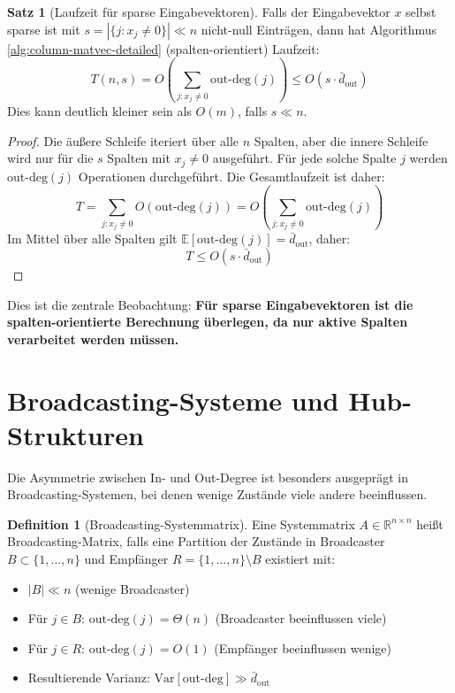﻿\documentclass[a4paper,12pt]{report}
\theoremstyle{definition}
\newtheorem{definition}{Definition}
\newtheorem{satz}{Satz}
\begin{document}
	\begin{satz}[Laufzeit für sparse Eingabevektoren]
		Falls der Eingabevektor $x$ selbst sparse ist mit $s = |\{j : x_j \neq 0\}| \ll n$ nicht-null Einträgen, dann hat Algorithmus \ref{alg:column-matvec-detailed} (spalten-orientiert) Laufzeit:
		\[
		T(n,s) = O\left(\sum_{j: x_j \neq 0} \text{out-deg}(j)\right) \leq O(s \cdot \bar{d}_{\text{out}})
		\]
		Dies kann deutlich kleiner sein als $O(m)$, falls $s \ll n$.
	\end{satz}
	
	\begin{proof}
		Die äußere Schleife iteriert über alle $n$ Spalten, aber die innere Schleife wird nur für die $s$ Spalten mit $x_j \neq 0$ ausgeführt. Für jede solche Spalte $j$ werden $\text{out-deg}(j)$ Operationen durchgeführt. Die Gesamtlaufzeit ist daher:
		\[
		T = \sum_{j: x_j \neq 0} O(\text{out-deg}(j)) = O\left(\sum_{j: x_j \neq 0} \text{out-deg}(j)\right)
		\]
		Im Mittel über alle Spalten gilt $\mathbb{E}[\text{out-deg}(j)] = \bar{d}_{\text{out}}$, daher:
		\[
		T \leq O(s \cdot \bar{d}_{\text{out}})
		\]
	\end{proof}
	
	Dies ist die zentrale Beobachtung: \textbf{Für sparse Eingabevektoren ist die spalten-orientierte Berechnung überlegen, da nur aktive Spalten verarbeitet werden müssen.}
	
	\section{Broadcasting-Systeme und Hub-Strukturen}
	
	Die Asymmetrie zwischen In- und Out-Degree ist besonders ausgeprägt in Broadcasting-Systemen, bei denen wenige Zustände viele andere beeinflussen.
	
	\begin{definition}[Broadcasting-Systemmatrix]
		Eine Systemmatrix $A \in \mathbb{R}^{n \times n}$ heißt Broadcasting-Matrix, falls eine Partition der Zustände in Broadcaster $B \subset \{1,\ldots,n\}$ und Empfänger $R = \{1,\ldots,n\} \setminus B$ existiert mit:
		\begin{itemize}
			\item $|B| \ll n$ (wenige Broadcaster)
			\item Für $j \in B$: $\text{out-deg}(j) = \Theta(n)$ (Broadcaster beeinflussen viele)
			\item Für $j \in R$: $\text{out-deg}(j) = O(1)$ (Empfänger beeinflussen wenige)
			\item Resultierende Varianz: $\text{Var}[\text{out-deg}] \gg \bar{d}_{\text{out}}$
		\end{itemize}
	\end{definition}
	
\end{document}

